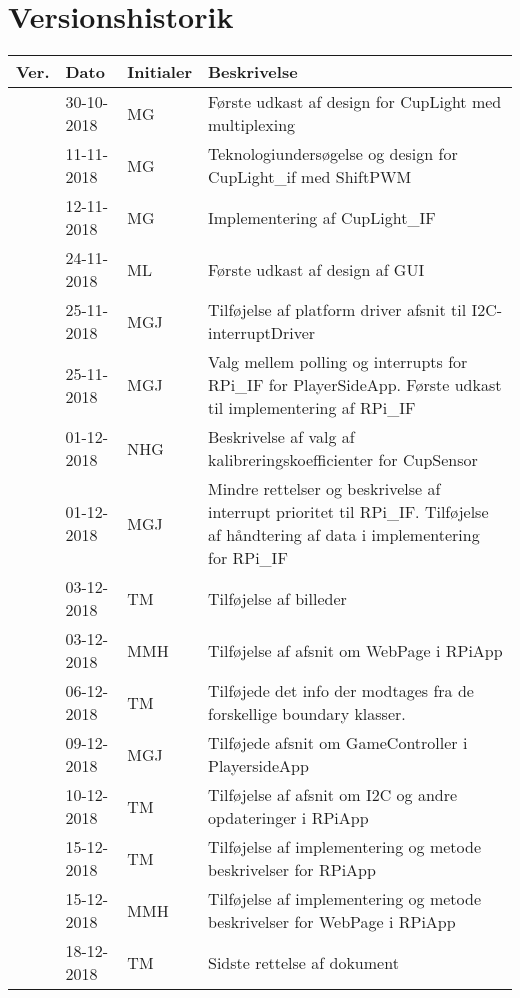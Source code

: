 \documentclass[Softwaredesign/Softwaredesign_main.tex]{subfiles}
\begin{document}
\section{Versionshistorik}
\begin{longtable}{|L{0.07\textwidth}|L{0.15\textwidth}|L{0.13\textwidth}|L{0.55\textwidth}|}
        \hline
        \textbf{Ver.} & \textbf{Dato} & \textbf{Initialer} & \textbf{Beskrivelse}  \\ \hline
         & 30-10-2018 & MG &  Første udkast af design for CupLight med multiplexing\\ \hline
         & 11-11-2018 & MG &  Teknologiundersøgelse og design for CupLight\_if med ShiftPWM\\ \hline
         & 12-11-2018 & MG &  Implementering af CupLight\_IF\\ \hline
         & 24-11-2018 & ML & Første udkast af design af GUI \\ \hline
         & 25-11-2018 & MGJ & Tilføjelse af platform driver afsnit til I2C-interruptDriver \\ \hline
         & 25-11-2018 & MGJ & Valg mellem polling og interrupts for RPi\_IF for PlayerSideApp. Første udkast til implementering  af RPi\_IF \\ \hline
         & 01-12-2018 & NHG & Beskrivelse af valg af kalibreringskoefficienter for CupSensor \\ \hline 
         & 01-12-2018 & MGJ & Mindre rettelser og beskrivelse af interrupt prioritet til RPi\_IF. Tilføjelse af håndtering af data i implementering for RPi\_IF \\ \hline
         & 03-12-2018 & TM & Tilføjelse af billeder \\ \hline
         & 03-12-2018 & MMH & Tilføjelse af afsnit om WebPage i RPiApp \\ \hline
         & 06-12-2018 & TM & Tilføjede det info der modtages fra de forskellige boundary klasser. \\ \hline
         & 09-12-2018 & MGJ & Tilføjede afsnit om GameController i PlayersideApp \\ \hline
         & 10-12-2018 & TM & Tilføjelse af afsnit om I2C og andre opdateringer i RPiApp \\ \hline
         & 15-12-2018 & TM & Tilføjelse af implementering og metode beskrivelser for RPiApp \\ \hline
         & 15-12-2018 & MMH & Tilføjelse af implementering og metode beskrivelser for WebPage i RPiApp \\\hline
         & 18-12-2018 & TM & Sidste rettelse af dokument \\\hline
\end{longtable}
\end{document}
